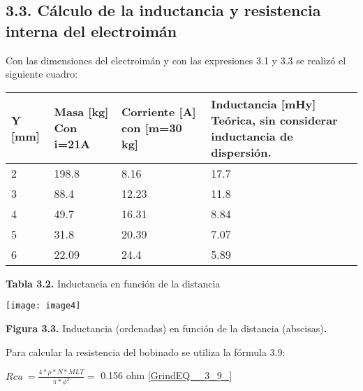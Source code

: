 \documentclass{article} %
\begin{document}
\noindent 
\subsection{3.3. C\'{a}lculo de la inductancia y resistencia interna del electroim\'{a}n}

\noindent 

\noindent Con las dimensiones del electroim\'{a}n y con las expresiones 3.1 y 3.3 se realiz\'{o} el siguiente cuadro:

\noindent 

\noindent 

\noindent 

\noindent 

\noindent 

\noindent 

\noindent 

\begin{tabular}{|p{0.6in}|p{0.8in}|p{0.9in}|p{1.9in}|} \hline 
Y [mm] & Masa [kg] \newline Con i=21A & Corriente [A] \newline con [m=30 kg] & Inductancia [mHy] Te\'{o}rica, sin considerar inductancia de dispersi\'{o}n.\newline   \\ \hline 
2 & 198.8 & 8.16 & 17.7 \\ \hline 
3 & 88.4 & 12.23 & 11.8 \\ \hline 
4 & 49.7 & 16.31 & 8.84 \\ \hline 
5 & 31.8 & 20.39 & 7.07 \\ \hline 
6 & 22.09 & 24.4 & 5.89 \\ \hline 
\end{tabular}

\textbf{Tabla 3.2. }Inductancia en funci\'{o}n de la distancia

\noindent \textbf{}

 \texttt{[image: image4]}   

\noindent \textbf{Figura 3.3. }Inductancia (ordenadas) en funci\'{o}n de la distancia (abscisas)\textbf{.}

\noindent 

\noindent Para calcular la resistencia del bobinado se utiliza la f\'{o}rmula 3.9:

\noindent 

\noindent $Rcu\ =\frac{4*\rho *N*MLT}{\pi *{\phi }^2}=$ 0.156 ohm         \eqref{GrindEQ__3_9_}     
\end{document}
